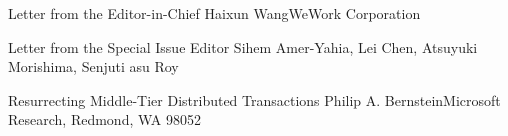 \documentclass[11pt]{article}
\begin{document}


\begin{bulletin}


%
%

\begin{lettersection}


\begin{letter}{Letter from the Editor-in-Chief}
{Haixun Wang}{WeWork Corporation}

\end{letter}
%
\newpage
%
%
\begin{letter}{Letter from the Special Issue Editor}
{Sihem Amer-Yahia, Lei Chen, Atsuyuki Morishima, Senjuti asu Roy}
{}


\end{letter}

\end{lettersection}


\begin{opinionsection}
\begin{opinion}{Resurrecting Middle-Tier Distributed Transactions}
{Philip A. Bernstein}{Microsoft Research, Redmond, WA 98052}

\end{opinion}
\end{opinionsection}


\end{bulletin}
\end{document}
